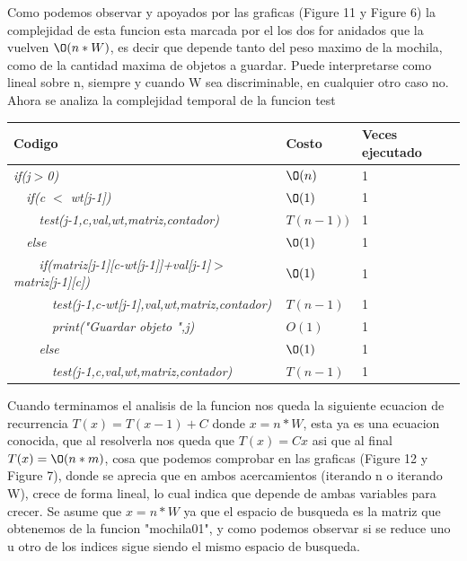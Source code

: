 \documentclass[spanish]{article}
\begin{document}
 		Como podemos observar y apoyados por las graficas (Figure 11 y Figure 6) la complejidad de esta funcion esta marcada por el los dos for anidados que la vuelven $\O(n*W)$, es decir que depende tanto del peso maximo de la mochila, como de la cantidad maxima de objetos a guardar. Puede interpretarse como lineal sobre n, siempre y cuando W sea discriminable, en cualquier otro caso no.\\
 		Ahora se analiza la complejidad temporal de la funcion test\\
 		\begin{center}
 			\begin{table}[H]
 				\begin{tabular}{|l|l|l|}
 					\hline
 					\rowcolor[HTML]{FFCC67} 
 					Codigo                           & Costo & Veces ejecutado \\ \hline
 					\textit{if(j$>$0)}                    & $\O(n)$    & 1               \\ \hline
 					\textit{\  \  if(c $<$ wt[j-1])}                    & $\O(1)$    & 1               \\ \hline
 					\textit{\  \  \  \  test(j-1,c,val,wt,matriz,contador)}                    & $T(n-1))$    & 1               \\ \hline
 					\textit{\  \  else}                    & $\O(1)$    & 1               \\ \hline
 					\textit{\  \  \  \  if(matriz[j-1][c-wt[j-1]]+val[j-1]$>$matriz[j-1][c])}                    & $\O(1)$    & 1               \\ \hline 					
 					\textit{\  \  \  \  \  \  test(j-1,c-wt[j-1],val,wt,matriz,contador)}                    & $T(n-1)$    & 1               \\ \hline
 					\textit{\  \  \  \  \  \  print("Guardar objeto ",j)}                    & $O(1)$    & 1               \\ \hline  
 					\textit{\  \  \  \  else}                    & $\O(1)$    & 1              \\ \hline 
 					\textit{\  \  \  \  \  \  test(j-1,c,val,wt,matriz,contador)}                    & $T(n-1)$    & 1               \\ \hline 								
 				\end{tabular}
 			\end{table}										
 		\end{center}
 		Cuando terminamos el analisis de la funcion nos queda la siguiente ecuacion de recurrencia $T(x) = T(x-1) + C$ donde $x = n*W$, esta ya es una ecuacion conocida, que al resolverla nos queda que $T(x) = Cx$ asi que al final $T(x)=\O(n*m)$, cosa que podemos comprobar en las graficas (Figure 12 y Figure 7), donde se aprecia que en ambos acercamientos (iterando n o iterando W), crece de forma lineal, lo cual indica que depende de ambas variables para crecer. Se asume que $x = n*W$ ya que el espacio de busqueda es la matriz que obtenemos de la funcion "mochila01", y como podemos observar si se reduce uno u otro de los indices sigue siendo el mismo espacio de busqueda.
\end{document}
